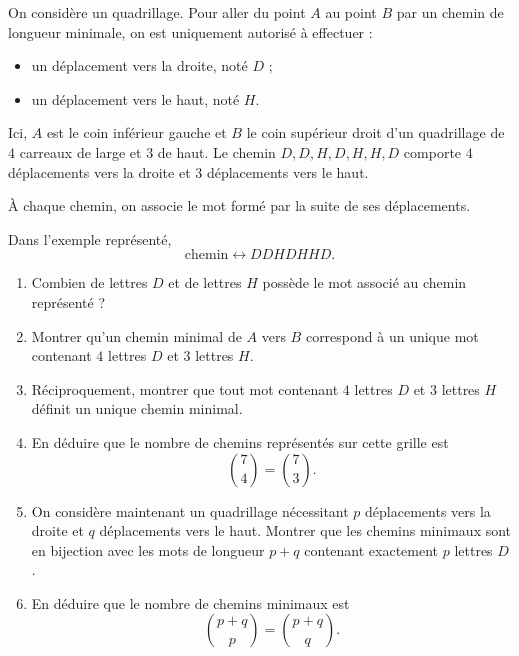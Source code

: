 On considère un quadrillage. Pour aller du point $A$ au point $B$ par un
chemin de longueur minimale, on est uniquement autorisé à effectuer :
\begin{itemize}
  \item un déplacement vers la droite, noté $D$ ;
  \item un déplacement vers le haut, noté $H$.
\end{itemize}
Ici, $A$ est le coin inférieur gauche et $B$ le coin supérieur droit d'un
quadrillage de $4$ carreaux de large et $3$ de haut. Le chemin
$D, D, H, D, H, H, D$ comporte $4$ déplacements vers la droite et $3$
déplacements vers le haut.

À chaque chemin, on associe le mot formé par la suite de ses déplacements.

Dans l'exemple représenté,
\[
\text{chemin} \longleftrightarrow DDHDHHD.
\]
\begin{enumerate}
  \item Combien de lettres $D$ et de lettres $H$ possède le mot associé au
  chemin représenté ?
  \item Montrer qu'un chemin minimal de $A$ vers $B$ correspond à un unique
  mot contenant $4$ lettres $D$ et $3$ lettres $H$.
  \item Réciproquement, montrer que tout mot contenant $4$ lettres $D$ et $3$
  lettres $H$ définit un unique chemin minimal.
  \item En déduire que le nombre de chemins représentés sur cette grille est
  \[
  \binom{7}{4} = \binom{7}{3}.
  \]
  \item On considère maintenant un quadrillage nécessitant $p$ déplacements
  vers la droite et $q$ déplacements vers le haut. Montrer que les chemins
  minimaux sont en bijection avec les mots de longueur $p + q$ contenant
  exactement $p$ lettres $D$.
  \item En déduire que le nombre de chemins minimaux est
  \[
  \binom{p+q}{p} = \binom{p+q}{q}.
  \]
\end{enumerate}
